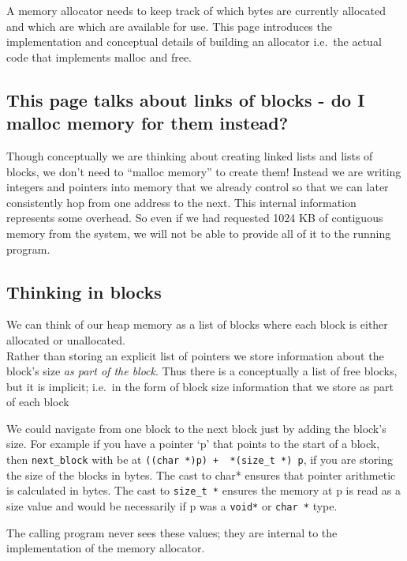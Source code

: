 A memory allocator needs to keep track of which bytes are currently
allocated and which are which are available for use. This page
introduces the implementation and conceptual details of building an
allocator i.e.~the actual code that implements malloc and free.

\subsection{This page talks about links of blocks - do I malloc memory
for them
instead?}\label{this-page-talks-about-links-of-blocks---do-i-malloc-memory-for-them-instead}

Though conceptually we are thinking about creating linked lists and
lists of blocks, we don't need to ``malloc memory'' to create them!
Instead we are writing integers and pointers into memory that we already
control so that we can later consistently hop from one address to the
next. This internal information represents some overhead. So even if we
had requested 1024 KB of contiguous memory from the system, we will not
be able to provide all of it to the running program.

\subsection{Thinking in blocks}\label{thinking-in-blocks}

We can think of our heap memory as a list of blocks where each block is
either allocated or unallocated.\\Rather than storing an explicit list
of pointers we store information about the block's size \emph{as part of
the block}. Thus there is a conceptually a list of free blocks, but it
is implicit; i.e.~in the form of block size information that we store as
part of each block

We could navigate from one block to the next block just by adding the
block's size. For example if you have a pointer `p' that points to the
start of a block, then \texttt{next\_block} with be at
\texttt{((char\ *)p)\ +\ \ *(size\_t\ *)\ p}, if you are storing the
size of the blocks in bytes. The cast to char* ensures that pointer
arithmetic is calculated in bytes. The cast to \texttt{size\_t\ *}
ensures the memory at p is read as a size value and would be necessarily
if p was a \texttt{void*} or \texttt{char\ *} type.

The calling program never sees these values; they are internal to the
implementation of the memory allocator.

